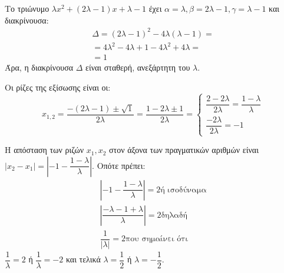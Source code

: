 
\begin{alist}
\item Το τριώνυμο $\lambda x^2 + (2\lambda - 1)x + \lambda - 1$ έχει $\alpha = \lambda, \beta = 2\lambda - 1, \gamma = \lambda - 1$ και
διακρίνουσα:
\begin{gather*}
\Delta = (2\lambda - 1)^2 - 4\lambda(\lambda - 1) = \\
= 4\lambda^2 - 4\lambda + 1 - 4\lambda^2 + 4\lambda = \\
= 1
\end{gather*}
Άρα, η διακρίνουσα $\Delta$ είναι σταθερή, ανεξάρτητη του $\lambda$.

\item Οι ρίζες της εξίσωσης είναι οι:
\[x_{1,2} = \dfrac{-(2\lambda - 1) \pm \sqrt{1}}{2\lambda} = \dfrac{1 - 2\lambda \pm 1}{2\lambda} = \begin{cases} \dfrac{2 - 2\lambda}{2\lambda} = \dfrac{1 - \lambda}{\lambda} \\ \dfrac{-2\lambda}{2\lambda} = -1 \end{cases}\]

\item Η απόσταση των ριζών $x_1, x_2$ στον άξονα των πραγματικών αριθμών είναι
$|x_2 - x_1| = \left| -1 - \dfrac{1 - \lambda}{\lambda} \right|$. Οπότε πρέπει:
\begin{gather*}
\left| -1 - \dfrac{1 - \lambda}{\lambda} \right| = 2\text{ή ισοδύναμα} \\
\left| \dfrac{-\lambda - 1 + \lambda}{\lambda} \right| = 2\text{δηλαδή} \\
\dfrac{1}{|\lambda|} = 2\text{που σημαίνει ότι}
\end{gather*}
$\dfrac{1}{\lambda} = 2$ ή $\dfrac{1}{\lambda} = -2$ και τελικά
$\lambda = \dfrac{1}{2}$ ή $\lambda = -\dfrac{1}{2}$.
\end{alist}

